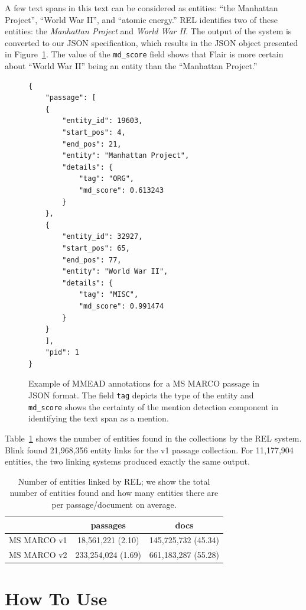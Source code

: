 A few text spans in this text can be considered as entities: ``the Manhattan Project'', ``World War II'', and ``atomic energy.'' REL identifies two of these entities: the \emph{Manhattan Project} and \emph{World War II}. 
The output of the system is converted to our JSON specification, which results in the JSON object presented in Figure~\ref{fig:json-example-passage-v1}. The value of the \texttt{md\_score} field shows that Flair is more certain about ``World War II'' being an entity than the ``Manhattan Project.'' 

\begin{figure}
	\begin{verbatim}
{
	"passage": [
	{
		"entity_id": 19603, 
		"start_pos": 4, 
		"end_pos": 21,
		"entity": "Manhattan Project",
		"details": {
			"tag": "ORG",
			"md_score": 0.613243
		}
	}, 
	{
		"entity_id": 32927,
		"start_pos": 65,
		"end_pos": 77,
		"entity": "World War II",
		"details": {
			"tag": "MISC",
			"md_score": 0.991474
		}
	}
	], 
	"pid": 1
}
	\end{verbatim}
\caption{Example of MMEAD annotations for a MS MARCO passage in JSON format. The field \texttt{tag} depicts the type of the entity and \texttt{md\_score} shows the certainty of the mention detection component in identifying the text span as a mention.}
\label{fig:json-example-passage-v1}
\end{figure}

Table~\ref{number-links} shows the number of entities found in the collections by the REL system. Blink found 21,968,356 entity links for the v1 passage collection.  For 11,177,904 entities, the two linking systems produced exactly the same output. 

\begin{table}
\centering
\caption{Number of entities linked by REL; we show the total number of entities found and how many entities there are per passage/document on average.}
\begin{tabular}{c|c|c}
	\toprule
	& passages & docs \\
	\midrule
	MS MARCO v1 & 18,561,221 (2.10) & 145,725,732 (45.34) \\
	MS MARCO v2 & 233,254,024 (1.69) & 661,183,287 (55.28) \\
	\bottomrule
\end{tabular}
\label{number-links}
\end{table}

\section{How To Use}

